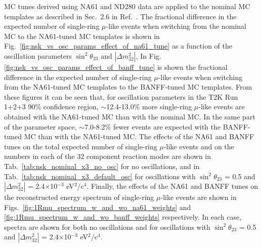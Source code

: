MC tunes derived using NA61 and ND280 data are applied to the nominal MC templates as described in 
Sec.\ 2.6 in Ref.\ \cite{OurRun123DisappAnalysis3Flavour}.
The fractional difference in the expected number of single-ring $\mu$-like events when switching from the nominal MC to the 
NA61-tuned MC templates is shown in Fig.\ \ref{fig:nsk_vs_osc_params_effect_of_na61_tune} as a function of the oscillation 
parameters $\sin^{2}{\theta_{23}}$ and $|\Delta m^{2}_{32}|$,
In Fig. \ref{fig:nsk_vs_osc_params_effect_of_banff_tune} is shown the fractional difference in the expected number of 
single-ring $\mu$-like events when switching from the NA61-tuned MC templates to the BANFF-tuned MC templates.
From these figures it can be seen that, for oscillation parameters in the T2K Run 1+2+3 90\% confidence region,
$\sim$12.4-13.0\% more single-ring $\mu$-like events are obtained with
the NA61-tuned MC than with the nominal MC.
In the same part of the parameter space, $\sim$7.0-8.2\% fewer events are expected with the BANFF-tuned MC
than with the NA61-tuned MC.
The effects of the NA61 and BANFF tunes on the total expected number of single-ring $\mu$-like events
and on the numbers in each of the 32 component reaction modes are shown in
Tab.\ \ref{tab:nsk_nominal_x3_no_osc} for no oscillations, and in
Tab.\ \ref{tab:nsk_nominal_x3_default_osc} for oscillations
with $\sin^{2}\theta_{23}$ = 0.5 and $|\Delta m^{2}_{32}|$ = 2.4$\times$10$^{-3}$ eV$^{2}$/c$^{4}$.
Finally, the effects of the NA61 and BANFF tunes on the reconstructed energy spectrum of
single-ring $\mu$-like events are shown in Figs.\
\ref{fig:1Rmu_spectrum_w_and_wo_na61_weights} and
\ref{fig:1Rmu_spectrum_w_and_wo_banff_weights} respectively.
In each case, spectra are shown for both no oscillations and for
oscillations with $\sin^{2}\theta_{23}$ = 0.5 and $|\Delta m^{2}_{32}|$ = 2.4$\times$10$^{-3}$ eV$^{2}$/c$^{4}$.

